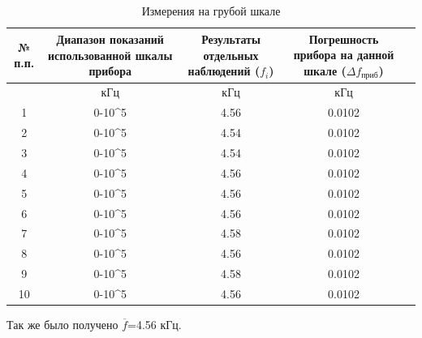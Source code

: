 \begin{center}
\begin{table}[h!]
\centering
\caption{Измерения на грубой шкале}
\label{tabl:1}
\begin{tabular}{|c|c|c|c|c|}
\hline
\begin{minipage}{7mm}
    № п.п. 
\end{minipage}&
\begin{minipage}{5cm}
    Диапазон показаний использованной шкалы прибора
\end{minipage} &
\begin{minipage}{5cm}
    Результаты отдельных наблюдений ($f_i$)
\end{minipage} &
\begin{minipage}{5cm}
    Погрешность прибора на данной шкале ($\Delta f_{\text{приб}}$)
\end{minipage}\\
\hline
{}&кГц&кГц&кГц\\
\hline
1 &  0-10^5  &  4.56  &  0.0102 \\
2 &  0-10^5  &  4.54  &  0.0102 \\
3 &  0-10^5  &  4.54  &  0.0102 \\
4 &  0-10^5  &  4.56  &  0.0102 \\
5 & 0-10^5  &  4.56  &  0.0102 \\
6 & 0-10^5  &  4.56  &  0.0102 \\
7 & 0-10^5  &  4.58  &  0.0102 \\
8 & 0-10^5  &  4.56  &  0.0102 \\
9 & 0-10^5  &  4.58  &  0.0102 \\
10& 0-10^5  &  4.56  &  0.0102 \\
\hline
\end{tabular}
\end{table}
\end{center}
Так же было получено $\overline{f}$=4.56 кГц.\\


